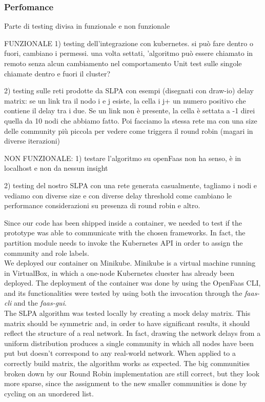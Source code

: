 \subsubsection*{Perfomance}




Parte di testing divisa in funzionale e non funzionale

FUNZIONALE
1) testing dell'integrazione con kubernetes.
    si può fare dentro o fuori, cambiano i permessi.
    una volta settati, 'algoritmo può essere chiamato in remoto senza alcun cambiamento nel comportamento
    Unit test sulle singole chiamate dentro e fuori il cluster?

2) testing sulle reti prodotte da SLPA con esempi (disegnati con draw-io)
    delay matrix: se un link tra il nodo i e j esiste, la cella i j+ un numero positivo che contiene il delay tra i
    due. Se un link non è presente, la cella è settata a -1 
    direi quella da 10 nodi che abbiamo fatto. Poi facciamo la stessa rete ma con una size delle 
    community più piccola per vedere come triggera il round robin (magari in diverse iterazioni)

NON FUNZIONALE:
1) testare l'algoritmo su openFaas non ha senso, è in localhost e non da nessun insight

2) testing del nostro SLPA con una rete generata casualmente, tagliamo i nodi e vediamo  con diverse size
    e con diverse delay threshold come cambiano le performance
    considerazioni su presenza di round robin e altro.










Since our code has been shipped inside a container, we needed to test if the prototype
was able to communicate with the chosen frameworks. In fact, the partition module  needs to invoke the Kubernetes API
in order to assign the community and role labels.\\
We deployed our container on Minikube. Minikube is a virtual machine running in VirtualBox, in which a
one-node Kubernetes cluester has already been deployed. The deployment of the container 
was done by using the OpenFaas CLI, and its functionalities were tested by using both the invocation
through the \textit{faas-cli} and the \textit{faas-gui}.\\
The SLPA algorithm was tested locally by creating a mock delay matrix. This matrix should be symmetric and, 
in order to have significant results, it should reflect the structure of a real network. In fact, drawing the network
delays from a uniform distribution produces a single community in which all nodes have been put but doesn't correspond
to any real-world network.
When applied to a correctly build matrix, the algorithm works as expected. The big communities broken down by our Round Robin 
implementation are still correct, but they look more sparse, since the assignment to the new smaller communities is done by
cycling on an unordered list.